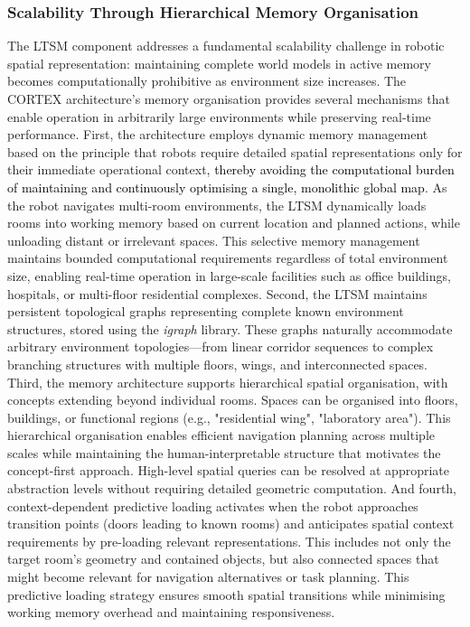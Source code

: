 \documentclass[10pt,a4paper]{article}
\begin{document}
\subsubsection {Scalability Through Hierarchical Memory Organisation}
The LTSM component addresses a fundamental scalability challenge in robotic spatial representation: maintaining complete world models in active memory becomes computationally prohibitive as environment size increases. The CORTEX architecture's memory organisation provides several mechanisms that enable operation in arbitrarily large environments while preserving real-time performance. First, the architecture employs dynamic memory management based on the principle that robots require detailed spatial representations only for their immediate operational context\textcolor{black}{, thereby avoiding the computational burden of maintaining and continuously optimising a single, monolithic global map}. As the robot navigates multi-room environments, the LTSM dynamically loads rooms into working memory based on current location and planned actions, while unloading distant or irrelevant spaces. This selective memory management maintains bounded computational requirements regardless of total environment size, enabling real-time operation in large-scale facilities such as office buildings, hospitals, or multi-floor residential complexes.
Second, the LTSM maintains persistent topological graphs representing complete known environment structures, stored using the \textit{igraph} library. These graphs naturally accommodate arbitrary environment topologies—from linear corridor sequences to complex branching structures with multiple floors, wings, and interconnected spaces.
Third, the memory architecture supports hierarchical spatial organisation, with concepts extending beyond individual rooms. Spaces can be organised into floors, buildings, or functional regions (e.g., "residential wing", "laboratory area"). This hierarchical organisation enables efficient navigation planning across multiple scales while maintaining the human-interpretable structure that motivates the concept-first approach. High-level spatial queries can be resolved at appropriate abstraction levels without requiring detailed geometric computation.
And fourth, context-dependent predictive loading activates when the robot approaches transition points (doors leading to known rooms) and anticipates spatial context requirements by pre-loading relevant representations. This includes not only the target room's geometry and contained objects, but also connected spaces that might become relevant for navigation alternatives or task planning. This predictive loading strategy ensures smooth spatial transitions while minimising working memory overhead and maintaining responsiveness.
\end{document}
